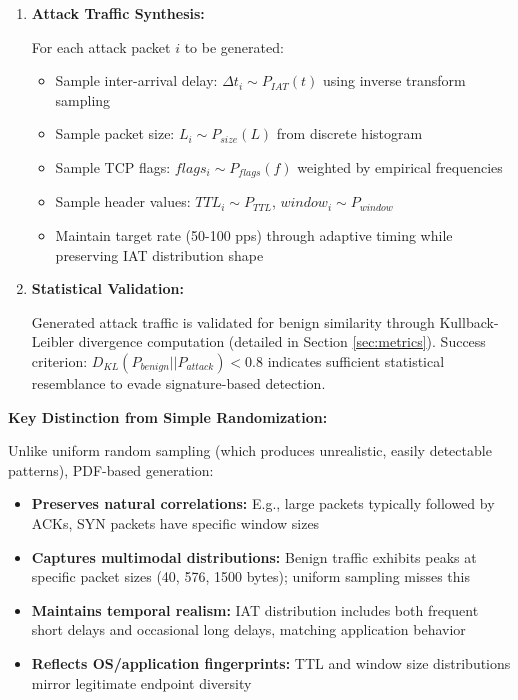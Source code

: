 \begin{enumerate}
    \item \textbf{Attack Traffic Synthesis:}
    
    For each attack packet $i$ to be generated:
    \begin{itemize}
        \item Sample inter-arrival delay: $\Delta t_i \sim P_{IAT}(t)$ using inverse transform sampling
        \item Sample packet size: $L_i \sim P_{size}(L)$ from discrete histogram
        \item Sample TCP flags: $flags_i \sim P_{flags}(f)$ weighted by empirical frequencies
        \item Sample header values: $TTL_i \sim P_{TTL}$, $window_i \sim P_{window}$
        \item Maintain target rate (50-100 pps) through adaptive timing while preserving IAT distribution shape
    \end{itemize}
    
    \item \textbf{Statistical Validation:}
    
    Generated attack traffic is validated for benign similarity through Kullback-Leibler divergence computation (detailed in Section \ref{sec:metrics}). Success criterion: $D_{KL}(P_{benign} || P_{attack}) < 0.8$ indicates sufficient statistical resemblance to evade signature-based detection.
\end{enumerate}

\textbf{Key Distinction from Simple Randomization:}

Unlike uniform random sampling (which produces unrealistic, easily detectable patterns), PDF-based generation:
\begin{itemize}
    \item \textbf{Preserves natural correlations:} E.g., large packets typically followed by ACKs, SYN packets have specific window sizes
    \item \textbf{Captures multimodal distributions:} Benign traffic exhibits peaks at specific packet sizes (40, 576, 1500 bytes); uniform sampling misses this
    \item \textbf{Maintains temporal realism:} IAT distribution includes both frequent short delays and occasional long delays, matching application behavior
    \item \textbf{Reflects OS/application fingerprints:} TTL and window size distributions mirror legitimate endpoint diversity
\end{itemize}

